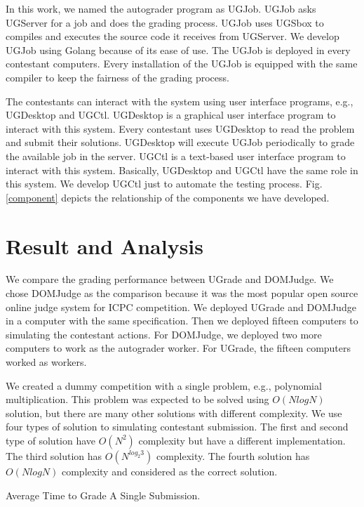 \documentclass[conference]{IEEEtran}
\begin{document}
In this work, we named the autograder program as UGJob. UGJob asks UGServer for a job and does the grading process. UGJob uses UGSbox to compiles and executes the source code it receives from UGServer. We develop UGJob using Golang because of its ease of use. The UGJob is deployed in every contestant computers. Every installation of the UGJob is equipped with the same compiler to keep the fairness of the grading process.

The contestants can interact with the system using user interface programs, e.g., UGDesktop and UGCtl. UGDesktop is a graphical user interface program to interact with this system. Every contestant uses UGDesktop to read the problem and submit their solutions. UGDesktop will execute UGJob periodically to grade the available job in the server. UGCtl is a text-based user interface program to interact with this system. Basically, UGDesktop and UGCtl have the same role in this system. We develop UGCtl just to automate the testing process. Fig. \ref{component} depicts the relationship of the components we have developed.

\section{Result and Analysis}

We compare the grading performance between UGrade and DOMJudge. We chose DOMJudge as the comparison because it was the most popular open source online judge system for ICPC competition. We deployed UGrade and DOMJudge in a computer with the same specification. Then we deployed fifteen computers to simulating the contestant actions. For DOMJudge, we deployed two more computers to work as the autograder worker. For UGrade, the fifteen computers worked as workers.

We created a dummy competition with a single problem, e.g., polynomial multiplication. This problem was expected to be solved using $O(N log N)$ solution, but there are many other solutions with different complexity. We use four types of solution to simulating contestant submission. The first and second type of solution have $O(N^2)$ complexity but have a different implementation. The third solution has $O(N^{log_2{3}})$ complexity. The fourth solution has $O(N log N)$ complexity and considered as the correct solution.

\begin{table}[ht!]
    \label{grading-time}
    \caption{Average Time to Grade A Single Submission.}
    \begin{center}
        
    \end{center}
\end{table}
\end{document}
